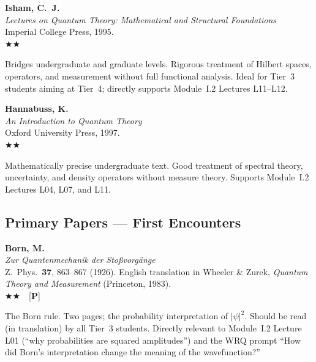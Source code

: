 \documentclass[11pt,a4paper]{article}
\newcommand{\recommended}{$\bigstar\bigstar$}
\newenvironment{bibentry}[1]{%
  \begin{tcolorbox}[entrybox=#1, top=4pt, bottom=4pt]%
}{%
  \end{tcolorbox}\smallskip%
}
\begin{document}
\begin{bibentry}{t3light}
\textbf{Isham, C.~J.}\\
\textit{Lectures on Quantum Theory: Mathematical and Structural Foundations}\\
Imperial College Press, 1995.\\[4pt]
\recommended\\[4pt]
\begin{tcolorbox}[annotbox]
Bridges undergraduate and graduate levels. Rigorous treatment of Hilbert spaces,
operators, and measurement without full functional analysis. Ideal for Tier~3
students aiming at Tier~4; directly supports Module~I.2 Lectures L11--L12.
\end{tcolorbox}
\end{bibentry}

\begin{bibentry}{t3light}
\textbf{Hannabuss, K.}\\
\textit{An Introduction to Quantum Theory}\\
Oxford University Press, 1997.\\[4pt]
\recommended\\[4pt]
\begin{tcolorbox}[annotbox]
Mathematically precise undergraduate text. Good treatment of spectral theory,
uncertainty, and density operators without measure theory. Supports Module~I.2
Lectures L04, L07, and L11.
\end{tcolorbox}
\end{bibentry}

\subsection{Primary Papers --- First Encounters}

\begin{bibentry}{t3light}
\textbf{Born, M.}\\
\textit{Zur Quantenmechanik der Sto\ss vorg\"ange}\\
Z.~Phys.~\textbf{37}, 863--867 (1926). English translation in Wheeler \& Zurek,
\textit{Quantum Theory and Measurement} (Princeton, 1983).\\[4pt]
\recommended\ \ [\textbf{P}]\\[4pt]
\begin{tcolorbox}[annotbox]
The Born rule. Two pages; the probability interpretation of $|\psi|^2$. Should be
read (in translation) by all Tier~3 students. Directly relevant to Module~I.2
Lecture L01 (``why probabilities are squared amplitudes'') and the WRQ prompt
``How did Born's interpretation change the meaning of the wavefunction?''
\end{tcolorbox}
\end{bibentry}
\end{document}

